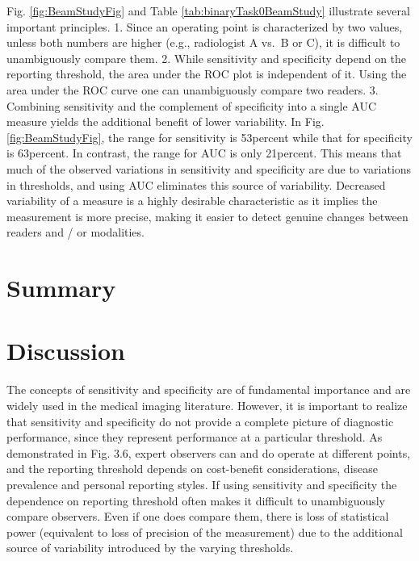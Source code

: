 \documentclass[
]{book}
\begin{document}
Fig. \ref{fig:BeamStudyFig} and Table \ref{tab:binaryTask0BeamStudy} illustrate several important principles.
1. Since an operating point is characterized by two values, unless both numbers are higher (e.g., radiologist A vs.~B or C), it is difficult to unambiguously compare them.
2. While sensitivity and specificity depend on the reporting threshold, the area under the ROC plot is independent of it. Using the area under the ROC curve one can unambiguously compare two readers.
3. Combining sensitivity and the complement of specificity into a single AUC measure yields the additional benefit of lower variability. In Fig. \ref{fig:BeamStudyFig}, the range for sensitivity is 53percent while that for specificity is 63percent. In contrast, the range for AUC is only 21percent. This means that much of the observed variations in sensitivity and specificity are due to variations in thresholds, and using AUC eliminates this source of variability. Decreased variability of a measure is a highly desirable characteristic as it implies the measurement is more precise, making it easier to detect genuine changes between readers and / or modalities.

\hypertarget{binaryTask-Summary}{%
\section{Summary}\label{binaryTask-Summary}}

\hypertarget{binaryTask-Discussion}{%
\section{Discussion}\label{binaryTask-Discussion}}

The concepts of sensitivity and specificity are of fundamental importance and are widely used in the medical imaging literature. However, it is important to realize that sensitivity and specificity do not provide a complete picture of diagnostic performance, since they represent performance at a particular threshold. As demonstrated in Fig. 3.6, expert observers can and do operate at different points, and the reporting threshold depends on cost-benefit considerations, disease prevalence and personal reporting styles. If using sensitivity and specificity the dependence on reporting threshold often makes it difficult to unambiguously compare observers. Even if one does compare them, there is loss of statistical power (equivalent to loss of precision of the measurement) due to the additional source of variability introduced by the varying thresholds.
\end{document}
